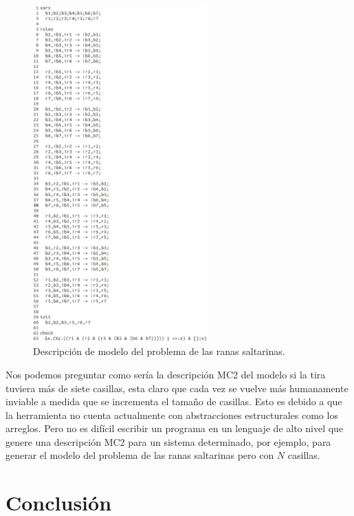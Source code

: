\begin{figure}[H]
  \centering
  \includegraphics[width=0.6\textwidth]{Figures/ranas.png}
  \caption{Descripción de modelo del problema de las ranas saltarinas.}
  \label{fig:ranas}
\end{figure}

\noindent Nos podemos preguntar como sería la descripción MC2 del modelo si la tira tuviera más de siete casillas, esta claro que cada vez se vuelve más humanamente inviable a medida que se incrementa el tamaño de casillas. Esto es debido a que la herramienta no cuenta actualmente con abstracciones estructurales como los arreglos. Pero no es difícil escribir un programa en un lenguaje de alto nivel que genere una descripción MC2 para un sistema determinado, por ejemplo, para generar el modelo del problema de las ranas saltarinas pero con $N$ casillas.

\chapter*{Conclusión}

